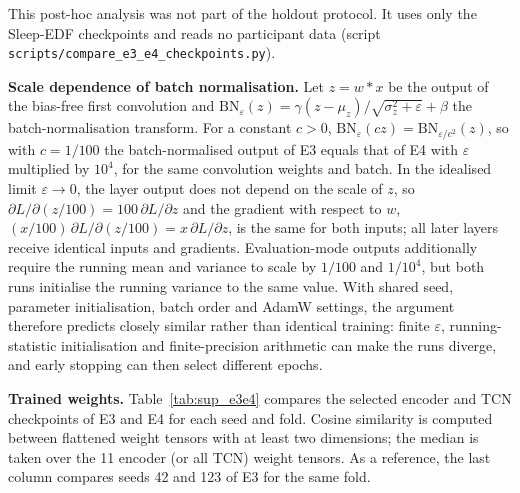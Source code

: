 \documentclass[10pt,a4paper]{article}
\begin{document}
This post-hoc analysis was not part of the holdout protocol. It uses only the Sleep-EDF checkpoints and
reads no participant data (script \nolinkurl{scripts/compare_e3_e4_checkpoints.py}).

\textbf{Scale dependence of batch normalisation.} Let $z=w*x$ be the output of the bias-free first convolution and
$\mathrm{BN}_\varepsilon(z)=\gamma(z-\mu_z)/\sqrt{\sigma_z^2+\varepsilon}+\beta$ the batch-normalisation
transform. For a constant $c>0$, $\mathrm{BN}_\varepsilon(cz)=\mathrm{BN}_{\varepsilon/c^2}(z)$, so with
$c=1/100$ the batch-normalised output of E3 equals that of E4 with $\varepsilon$ multiplied by
$10^4$, for the same convolution weights and batch. In the idealised limit $\varepsilon\to0$, the
layer output does not depend on the scale of $z$, so
$\partial L/\partial(z/100)=100\,\partial L/\partial z$ and the gradient with respect to $w$,
$(x/100)\,\partial L/\partial(z/100)=x\,\partial L/\partial z$, is the same for both inputs; all later
layers receive identical inputs and gradients. Evaluation-mode outputs additionally require the
running mean and variance to scale by $1/100$ and $1/10^4$, but both runs initialise the running
variance to the same value. With shared seed, parameter initialisation, batch order and AdamW
settings, the argument therefore predicts closely similar rather than identical training: finite
$\varepsilon$, running-statistic initialisation and finite-precision arithmetic can make the runs
diverge, and early stopping can then select different epochs.

\textbf{Trained weights.} Table~\ref{tab:sup_e3e4} compares the selected encoder and TCN checkpoints of
E3 and E4 for each seed and fold. Cosine similarity is computed between flattened weight tensors with
at least two dimensions; the median is taken over the 11 encoder (or all TCN) weight tensors. As a
reference, the last column compares seeds 42 and 123 of E3 for the same fold.
\end{document}
